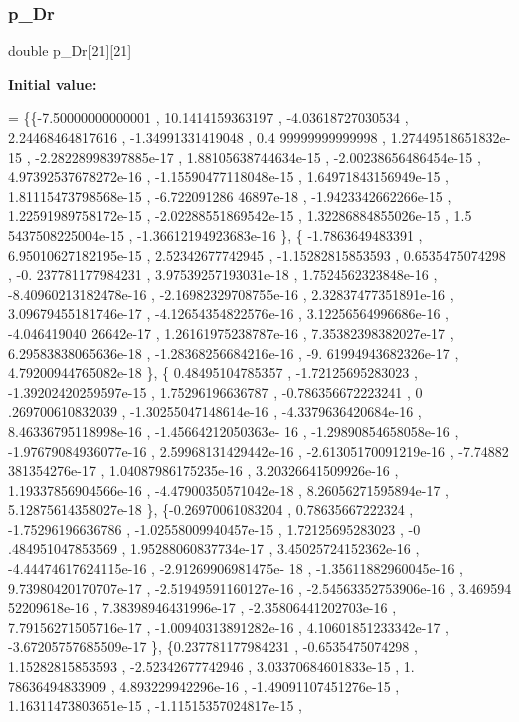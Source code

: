 \subsubsection{\texorpdfstring{p\+\_\+\+Dr}{p\_Dr}}
{\footnotesize\ttfamily double p\+\_\+\+Dr\mbox{[}21\mbox{]}\mbox{[}21\mbox{]}}

{\bfseries Initial value\+:}
\begin{DoxyCode}
= \{\{-7.50000000000001 ,  10.1414159363197 , -4.03618727030534 ,  2.24468464817616 , -1.34991331419048 , 0.4
      99999999999998 , 1.27449518651832e-15 , -2.28228998397885e-17 , 1.88105638744634e-15 , -2.00238656486454e-15
       , 4.97392537678272e-16 , -1.15590477118048e-15 , 1.64971843156949e-15 , 1.81115473798568e-15 , -6.722091286
      46897e-18 , -1.9423342662266e-15 , 1.22591989758172e-15 , -2.02288551869542e-15 , 1.32286884855026e-15 , 1.5
      5437508225004e-15 , -1.36612194923683e-16 \},
\{ -1.7863649483391 , 6.95010627182195e-15 ,  2.52342677742945 , -1.15282815853593 ,   0.6535475074298 , -0.
      237781177984231 , 3.97539257193031e-18 , 1.7524562323848e-16 , -8.40960213182478e-16 , -2.16982329708755e-16
       , 2.32837477351891e-16 , 3.09679455181746e-17 , -4.12654354822576e-16 , 3.12256564996686e-16 , -4.046419040
      26642e-17 , 1.26161975238787e-16 , 7.35382398382027e-17 , 6.29583838065636e-18 , -1.28368256684216e-16 , -9.
      61994943682326e-17 , 4.79200944765082e-18 \},
\{ 0.48495104785357 , -1.72125695283023 , -1.39202420259597e-15 ,  1.75296196636787 , -0.786356672223241 , 0
      .269700610832039 , -1.30255047148614e-16 , -4.3379636420684e-16 , 8.46336795118998e-16 , -1.45664212050363e-
      16 , -1.29890854658058e-16 , -1.97679084936077e-16 , 2.59968131429442e-16 , -2.61305170091219e-16 , -7.74882
      381354276e-17 , 1.04087986175235e-16 , 3.20326641509926e-16 , 1.19337856904566e-16 , -4.47900350571042e-18 ,
       8.26056271595894e-17 , 5.12875614358027e-18 \},
\{-0.26970061083204 ,  0.78635667222324 , -1.75296196636786 , -1.02558009940457e-15 ,  1.72125695283023 , -0
      .484951047853569 , 1.95288060837734e-17 , 3.45025724152362e-16 , -4.44474617624115e-16 , -2.91269906981475e-
      18 , -1.35611882960045e-16 , 9.73980420170707e-17 , -2.51949591160127e-16 , -2.54563352753906e-16 , 3.469594
      52209618e-16 , 7.38398946431996e-17 , -2.35806441202703e-16 , 7.79156271505716e-17 , -1.00940313891282e-16 ,
       4.10601851233342e-17 , -3.67205757685509e-17 \},
\{0.237781177984231 ,  -0.6535475074298 ,  1.15282815853593 , -2.52342677742946 , 3.03370684601833e-15 ,  1.
      78636494833909 , 4.893229942296e-16 , -1.49091107451276e-15 , 1.16311473803651e-15 , -1.11515357024817e-15 ,

\end{DoxyCode}
